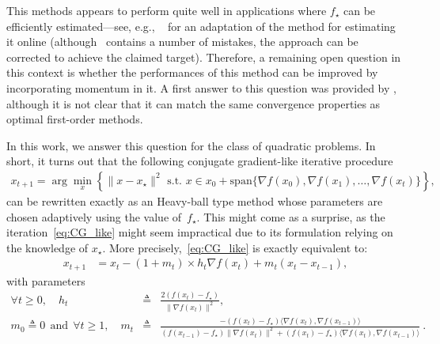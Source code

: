 \documentclass{article}
\newcommand{\Span}{\mathrm{span}}
\newcommand{\argmin}{\arg\!\min}
\newcommand{\xs}{x_\star}
\renewcommand{\geq}{\geqslant}
\begin{document}
    This methods appears to perform quite well in applications where $f_\star$ can be efficiently estimated---see, e.g.,
    ~\cite{hazan2019revisiting} for an adaptation of the method for estimating it online (although~\cite{hazan2019revisiting} contains a number of mistakes,
    the approach can be corrected to achieve the claimed target).
    Therefore, a remaining open question in this context is whether the performances of this method can be improved by incorporating momentum in it.
    A first answer to this question was provided by \citet{barre2020complexity}, although it is not clear that it can match the same convergence properties as optimal first-order methods.

    \noindent
    In this work, we answer this question for the class of quadratic problems.
    In short, it turns out that the following conjugate gradient-like iterative procedure
    \begin{equation}\label{eq:CG_like}
        \begin{aligned}
            x_{t+1} = \argmin_x \left\{ \| x-\xs\|^2 \text{ s.t. } x \in x_0 + \Span \{ \nabla f(x_0), \nabla f(x_1), \ldots, \nabla f(x_t)\} \right\},
        \end{aligned}
    \end{equation}
    can be rewritten exactly as an Heavy-ball type method whose parameters are chosen adaptively using the value of~$f_\star$.
    This might come as a surprise, as the iteration~\cref{eq:CG_like} might seem impractical due to its formulation relying on the knowledge of $\xs$.
    More precisely,~\cref{eq:CG_like} is exactly equivalent to:
    \begin{equation}\label{eq:PS_momentum}
        \begin{aligned}
            x_{t+1} &= x_t - (1+m_t) \times h_t \nabla f(x_t) + m_t (x_t - x_{t-1}),
        \end{aligned}
    \end{equation}
    with parameters
    \begin{eqnarray}
    \forall t\geq 0, \quad h_t &\triangleq& \frac{2(f(x_t)-f_\star)}{\| \nabla f(x_t) \|^2},\quad   \label{eq:PS_step_tuning}\\
    m_0\triangleq0 \ \  \text{and} \ \  \forall t\geq 1, \quad m_{t} &\triangleq& \frac{-(f(x_{t})-f_\star)\langle \nabla f(x_{t}), \nabla f(x_{t-1}) \rangle}{(f(x_{t-1})-f_\star)\| \nabla f(x_{t}) \|^2 + (f(x_{t})-f_\star)\langle \nabla f(x_{t}), \nabla f(x_{t-1}) \rangle}\ .\label{eq:PS_momentum_tuning}
    \end{eqnarray}
\end{document}
